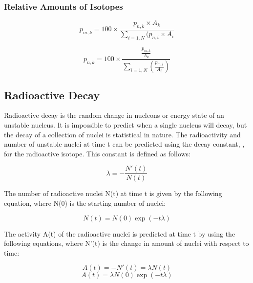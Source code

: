 \subsubsection{Relative Amounts of Isotopes}



\begin{equation}
p_{m,k} = 100 \times \frac{p_{n,k} \times A_{k}}{\sum_{i=1,N}(p_{n,i} \times A_i}
\end{equation}




\begin{equation}
p_{n,k} = 100 \times \frac{\frac{p_{m,k}}{A_{k}}}{\sum_{i=1,N}(\frac{p_{m,i}}{A_i})}
\end{equation}







\subsection{Radioactive Decay}

Radioactive decay is the random change in nucleons or energy state of an unstable nucleus.  It is impossible to predict when a single nucleus will decay, but the decay of a collection of nuclei is statistical in nature.  The radioactivity and number of unstable nuclei at time t can be predicted using the decay constant, \textlambda, for the radioactive isotope.  This constant is defined as follows:

\begin{equation}
\lambda = - \frac{N'(t)}{N(t)}
\end{equation}

The number of radioactive nuclei N(t) at time t is given by the following equation, where N(0) is the starting number of nuclei:

\begin{equation}
N(t) = N(0) \exp(-t \lambda)
\end{equation}

The activity A(t) of the radioactive nuclei is predicted at time t by using the following equations, where N'(t) is the change in amount of nuclei with respect to time:

\begin{equation}
A(t) = -N'(t) = \lambda N(t)
\end{equation}
\begin{equation}
A(t) = \lambda N(0) \exp(-t \lambda)
\end{equation}

